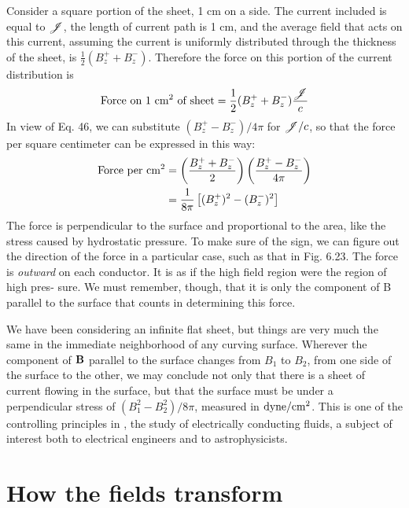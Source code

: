 Consider a square portion of the sheet, 1 cm on a side. The current
included is equal to $\mathscr{J}$, the length of current path is 1 cm, and the
average field that acts on this current, assuming the current is uniformly
distributed through the thickness of the sheet, is $\frac{1}{2}(B_z^++B_z^-)$.
Therefore the force on this portion of the current distribution is
\begin{equation}
  \text{Force on 1 $\textup{cm}^2$ of sheet} = \frac{1}{2}(B_z^++B_z^-)\frac{\mathscr{J}}{c}
\end{equation}
In view of Eq. 46, we can substitute $(B_z^+-B_z^-)/4\pi$ for $\mathscr{J}/c$, so that
the force per square centimeter can be expressed in this way:
\begin{align}
\begin{split}
  \text{Force per $\textup{cm}^2$}
       & = \left(\frac{B_z^++B_z^-}{2}\right)\left(\frac{B_z^+-B_z^-}{4\pi}\right) \\
       &= \frac{1}{8\pi} \left[(B_z^+)^2-(B_z^-)^2\right]
\end{split}
\end{align}
The force is perpendicular to the surface and proportional to the
area, like the stress caused by hydrostatic pressure. To make sure
of the sign, we can figure out the direction of the force in a particular
case, such as that in Fig. 6.23. The force is \emph{outward} on each conductor.
It is as if the high field region were the region of high pres-
sure. We must remember, though, that it is only the component of
B parallel to the surface that counts in determining this force.

We have been considering an infinite flat sheet, but things are very
much the same in the immediate neighborhood of any curving
surface. Wherever the component of $\mathbf{B}$ parallel to the surface
changes from $B_1$ to $B_2$, from one side of the surface to the other, we
may conclude not only that there is a sheet of current flowing in the
surface, but that the surface must be under a perpendicular stress of
$(B_1^2-B_2^2)/8\pi$, measured in $\textup{dyne}/\textup{cm}^2$. This is one of the controlling
principles in , the study of electrically
conducting fluids, a subject of interest both to electrical engineers
and to astrophysicists.

\iffalse

\section{How the fields transform}

